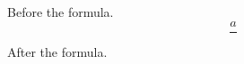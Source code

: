 \documentclass{article}
\begin{document}
Before the formula.
\[
\frac{a}{}
\]
After the formula.
\end{document}
